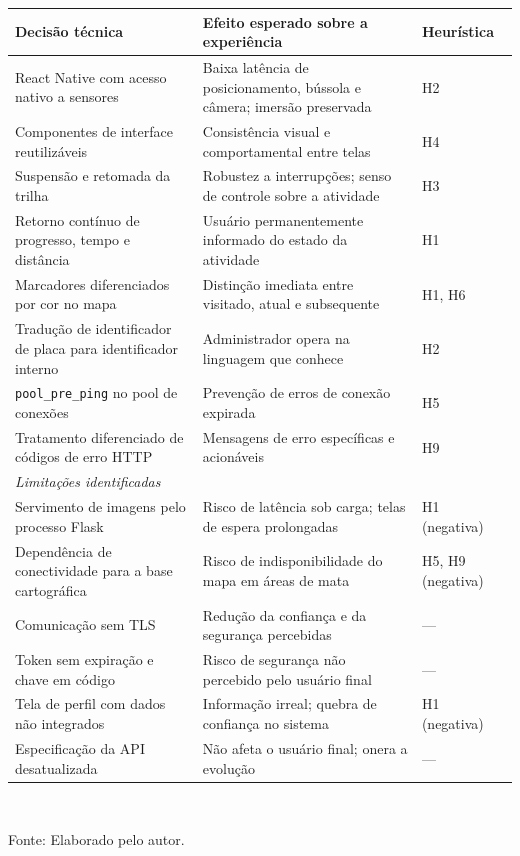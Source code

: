 \begin{quadro}[htb]
\centering
\caption{Mapeamento entre decisões técnicas, efeito sobre a experiência e heurística associada}
\label{quad:mapeamento}
\footnotesize
\begin{tabular}{p{4.0cm} p{4.6cm} p{2.6cm}}
\toprule
\textbf{Decisão técnica} & \textbf{Efeito esperado sobre a experiência} &
\textbf{Heurística} \\
\midrule
React Native com acesso nativo a sensores & Baixa latência de posicionamento,
bússola e câmera; imersão preservada & H2 \\
\addlinespace
Componentes de interface reutilizáveis & Consistência visual e comportamental
entre telas & H4 \\
\addlinespace
Suspensão e retomada da trilha & Robustez a interrupções; senso de controle sobre
a atividade & H3 \\
\addlinespace
Retorno contínuo de progresso, tempo e distância & Usuário permanentemente
informado do estado da atividade & H1 \\
\addlinespace
Marcadores diferenciados por cor no mapa & Distinção imediata entre visitado,
atual e subsequente & H1, H6 \\
\addlinespace
Tradução de identificador de placa para identificador interno & Administrador
opera na linguagem que conhece & H2 \\
\addlinespace
\texttt{pool\_pre\_ping} no pool de conexões & Prevenção de erros de conexão
expirada & H5 \\
\addlinespace
Tratamento diferenciado de códigos de erro HTTP & Mensagens de erro específicas e
acionáveis & H9 \\
\midrule
\multicolumn{3}{l}{\textit{Limitações identificadas}} \\
\midrule
Servimento de imagens pelo processo Flask & Risco de latência sob carga; telas de
espera prolongadas & H1 (negativa) \\
\addlinespace
Dependência de conectividade para a base cartográfica & Risco de indisponibilidade
do mapa em áreas de mata & H5, H9 (negativa) \\
\addlinespace
Comunicação sem TLS & Redução da confiança e da segurança percebidas & --- \\
\addlinespace
Token sem expiração e chave em código & Risco de segurança não percebido pelo
usuário final & --- \\
\addlinespace
Tela de perfil com dados não integrados & Informação irreal; quebra de confiança
no sistema & H1 (negativa) \\
\addlinespace
Especificação da API desatualizada & Não afeta o usuário final; onera a evolução &
--- \\
\bottomrule
\end{tabular}
\\[4pt]
\begin{flushleft}
Fonte: Elaborado pelo autor.
\end{flushleft}
\end{quadro}


